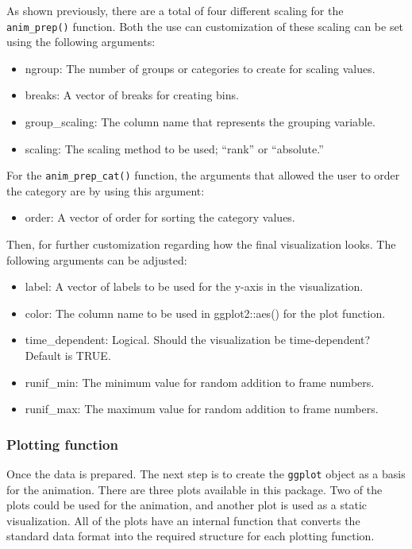 As shown previously, there are a total of four different scaling for the \texttt{anim\_prep()} function. Both the use can customization of these scaling can be set using the following arguments:

\begin{itemize}
\tightlist
\item
  ngroup: The number of groups or categories to create for scaling values.
\item
  breaks: A vector of breaks for creating bins.
\item
  group\_scaling: The column name that represents the grouping variable.
\item
  scaling: The scaling method to be used; ``rank'' or ``absolute.''
\end{itemize}

For the \texttt{anim\_prep\_cat()} function, the arguments that allowed the user to order the category are by using this argument:

\begin{itemize}
\tightlist
\item
  order: A vector of order for sorting the category values.
\end{itemize}

Then, for further customization regarding how the final visualization looks. The following arguments can be adjusted:

\begin{itemize}
\tightlist
\item
  label: A vector of labels to be used for the y-axis in the visualization.
\item
  color: The column name to be used in ggplot2::aes() for the plot function.
\item
  time\_dependent: Logical. Should the visualization be time-dependent? Default is TRUE.
\item
  runif\_min: The minimum value for random addition to frame numbers.
\item
  runif\_max: The maximum value for random addition to frame numbers.
\end{itemize}

\hypertarget{plotting-function}{%
\subsubsection{Plotting function}\label{plotting-function}}

Once the data is prepared. The next step is to create the \texttt{ggplot} object as a basis for the animation. There are three plots available in this package. Two of the plots could be used for the animation, and another plot is used as a static visualization. All of the plots have an internal function that converts the standard data format into the required structure for each plotting function.

